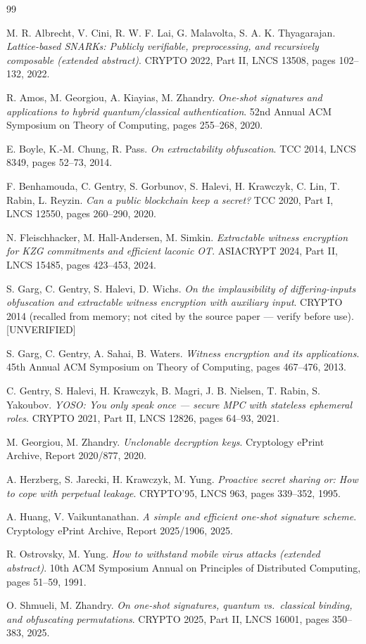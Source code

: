 \documentclass{aicr-conjecture}
\begin{document}
\begin{aicrbibliography}{99}

M. R. Albrecht, V. Cini, R. W. F. Lai, G. Malavolta,
S. A. K. Thyagarajan.
\emph{Lattice-based SNARKs: Publicly verifiable, preprocessing, and
recursively composable (extended abstract)}.
CRYPTO 2022, Part II, LNCS 13508, pages 102--132, 2022.

R. Amos, M. Georgiou, A. Kiayias, M. Zhandry.
\emph{One-shot signatures and applications to hybrid
quantum/classical authentication}.
52nd Annual ACM Symposium on Theory of Computing, pages 255--268,
2020.

E. Boyle, K.-M. Chung, R. Pass.
\emph{On extractability obfuscation}.
TCC 2014, LNCS 8349, pages 52--73, 2014.

F. Benhamouda, C. Gentry, S. Gorbunov, S. Halevi, H. Krawczyk,
C. Lin, T. Rabin, L. Reyzin.
\emph{Can a public blockchain keep a secret?}
TCC 2020, Part I, LNCS 12550, pages 260--290, 2020.

N. Fleischhacker, M. Hall-Andersen, M. Simkin.
\emph{Extractable witness encryption for KZG commitments and efficient
laconic OT}.
ASIACRYPT 2024, Part II, LNCS 15485, pages 423--453, 2024.

S. Garg, C. Gentry, S. Halevi, D. Wichs.
\emph{On the implausibility of differing-inputs obfuscation and
extractable witness encryption with auxiliary input}.
CRYPTO 2014 (recalled from memory; not cited by the source paper ---
verify before use). [UNVERIFIED]

S. Garg, C. Gentry, A. Sahai, B. Waters.
\emph{Witness encryption and its applications}.
45th Annual ACM Symposium on Theory of Computing, pages 467--476,
2013.

C. Gentry, S. Halevi, H. Krawczyk, B. Magri, J. B. Nielsen, T. Rabin,
S. Yakoubov.
\emph{YOSO: You only speak once --- secure MPC with stateless
ephemeral roles}.
CRYPTO 2021, Part II, LNCS 12826, pages 64--93, 2021.

M. Georgiou, M. Zhandry.
\emph{Unclonable decryption keys}.
Cryptology ePrint Archive, Report 2020/877, 2020.

A. Herzberg, S. Jarecki, H. Krawczyk, M. Yung.
\emph{Proactive secret sharing or: How to cope with perpetual
leakage}.
CRYPTO'95, LNCS 963, pages 339--352, 1995.

A. Huang, V. Vaikuntanathan.
\emph{A simple and efficient one-shot signature scheme}.
Cryptology ePrint Archive, Report 2025/1906, 2025.

R. Ostrovsky, M. Yung.
\emph{How to withstand mobile virus attacks (extended abstract)}.
10th ACM Symposium Annual on Principles of Distributed Computing,
pages 51--59, 1991.

O. Shmueli, M. Zhandry.
\emph{On one-shot signatures, quantum vs.\ classical binding, and
obfuscating permutations}.
CRYPTO 2025, Part II, LNCS 16001, pages 350--383, 2025.

\end{aicrbibliography}
\end{document}

